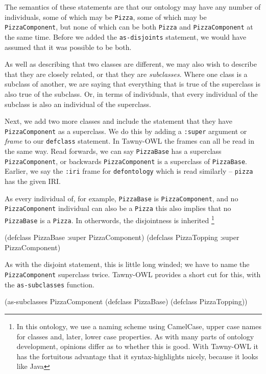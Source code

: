 \documentclass[11pt]{article}
\begin{document}
The semantics of these statements are that our ontology may have any
number of individuals, some of which may be \verb~Pizza~, some of which may
be \verb~PizzaComponent~, but none of which can be both \verb~Pizza~ and
\verb~PizzaComponent~ at the same time. Before we added the \verb~as-disjoints~
statement, we would have assumed that it was possible to be both.

As well as describing that two classes are different, we may also wish
to describe that they are closely related, or that they are
\emph{subclasses}. Where one class is a subclass of another, we are saying
that everything that is true of the superclass is also true of the
subclass. Or, in terms of individuals, that every individual of the
subclass is also an individual of the superclass.

Next, we add two more classes and include the statement that they have
\verb~PizzaComponent~ as a superclass. We do this by adding a \verb~:super~
argument or \emph{frame} to our \verb~defclass~ statement. In Tawny-OWL the frames
can all be read in the same way. Read forwards, we can say \verb~PizzaBase~
has a superclass \verb~PizzaComponent~, or backwards \verb~PizzaComponent~ is a
superclass of \verb~PizzaBase~. Earlier, we say the \verb~:iri~ frame for
\verb~defontology~ which is read similarly -- \verb~pizza~ has the given IRI.

As every individual of, for example, \verb~PizzaBase~ is \verb~PizzaComponent~, and no
\verb~PizzaComponent~ individual can also be a \verb~Pizza~ this also implies that no
\verb~PizzaBase~ is a \verb~Pizza~. In otherwords, the disjointness is inherited
\footnote{In this ontology, we use a naming scheme using CamelCase, upper case
names for classes and, later, lower case properties. As with many parts of
ontology development, opinions differ as to whether this is good. With
Tawny-OWL it has the fortuitous advantage that it syntax-highlights nicely,
because it looks like Java}

\begin{tawny}
(defclass PizzaBase
  :super PizzaComponent)
(defclass PizzaTopping
  :super PizzaComponent)
\end{tawny}


As with the disjoint statement, this is little long winded; we have to name
the \verb~PizzaComponent~ superclass twice. Tawny-OWL provides a short cut for
this, with the \verb~as-subclasses~ function.

\begin{tawny}
(as-subclasses
 PizzaComponent
 (defclass PizzaBase)
 (defclass PizzaTopping))
\end{tawny}
\end{document}
